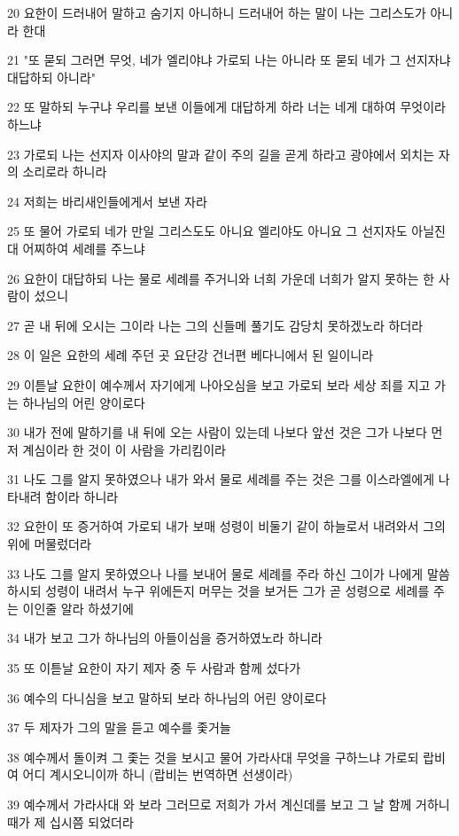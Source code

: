 \par 20 요한이 드러내어 말하고 숨기지 아니하니 드러내어 하는 말이 나는 그리스도가 아니라 한대
\par 21 "또 묻되 그러면 무엇, 네가 엘리야냐 가로되 나는 아니라 또 묻되 네가 그 선지자냐 대답하되 아니라"
\par 22 또 말하되 누구냐 우리를 보낸 이들에게 대답하게 하라 너는 네게 대하여 무엇이라 하느냐
\par 23 가로되 나는 선지자 이사야의 말과 같이 주의 길을 곧게 하라고 광야에서 외치는 자의 소리로라 하니라
\par 24 저희는 바리새인들에게서 보낸 자라
\par 25 또 물어 가로되 네가 만일 그리스도도 아니요 엘리야도 아니요 그 선지자도 아닐진대 어찌하여 세례를 주느냐
\par 26 요한이 대답하되 나는 물로 세례를 주거니와 너희 가운데 너희가 알지 못하는 한 사람이 섰으니
\par 27 곧 내 뒤에 오시는 그이라 나는 그의 신들메 풀기도 감당치 못하겠노라 하더라
\par 28 이 일은 요한의 세례 주던 곳 요단강 건너편 베다니에서 된 일이니라
\par 29 이튿날 요한이 예수께서 자기에게 나아오심을 보고 가로되 보라 세상 죄를 지고 가는 하나님의 어린 양이로다
\par 30 내가 전에 말하기를 내 뒤에 오는 사람이 있는데 나보다 앞선 것은 그가 나보다 먼저 계심이라 한 것이 이 사람을 가리킴이라
\par 31 나도 그를 알지 못하였으나 내가 와서 물로 세례를 주는 것은 그를 이스라엘에게 나타내려 함이라 하니라
\par 32 요한이 또 증거하여 가로되 내가 보매 성령이 비둘기 같이 하늘로서 내려와서 그의 위에 머물렀더라
\par 33 나도 그를 알지 못하였으나 나를 보내어 물로 세례를 주라 하신 그이가 나에게 말씀하시되 성령이 내려서 누구 위에든지 머무는 것을 보거든 그가 곧 성령으로 세례를 주는 이인줄 알라 하셨기에
\par 34 내가 보고 그가 하나님의 아들이심을 증거하였노라 하니라
\par 35 또 이튿날 요한이 자기 제자 중 두 사람과 함께 섰다가
\par 36 예수의 다니심을 보고 말하되 보라 하나님의 어린 양이로다
\par 37 두 제자가 그의 말을 듣고 예수를 좇거늘
\par 38 예수께서 돌이켜 그 좇는 것을 보시고 물어 가라사대 무엇을 구하느냐 가로되 랍비여 어디 계시오니이까 하니 (랍비는 번역하면 선생이라)
\par 39 예수께서 가라사대 와 보라 그러므로 저희가 가서 계신데를 보고 그 날 함께 거하니 때가 제 십시쯤 되었더라

